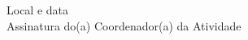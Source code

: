\documentclass[12pt,a4paper,oneside,brazil]{article}%
\begin{document}
\raggedleft%
\bigskip%
\begin{minipage}{.5\textwidth}%
\begin{center}%
\hrulefill%
\newline%
\bigskip%
\bigskip%
Local e data \\%
\hrulefill%
\newline%
\bigskip%
Assinatura do(a) Coordenador(a) da Atividade%
\end{center}%
\end{minipage}%
\end{document}
